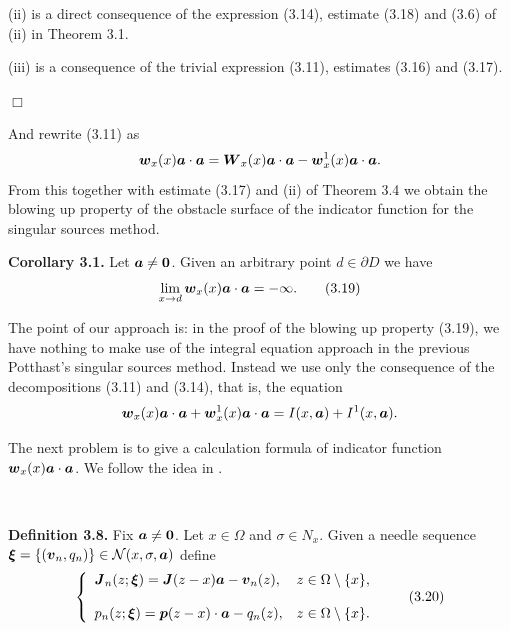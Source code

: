  \noindent
 (ii) is a direct consequence of  the expression  (3.14), estimate (3.18)
 and (3.6) of (ii) in Theorem 3.1.
 
 \noindent
 (iii) is a consequence of  the trivial expression (3.11), estimates (3.16) and (3.17).
 
 \noindent
 $\Box$
 

 And rewrite (3.11) as
 $$\displaystyle
 \mbox{\boldmath $w$}_x(x)\mbox{\boldmath $a$}\cdot\mbox{\boldmath $a$}
 = \mbox{\boldmath $W$}_x(x)\mbox{\boldmath $a$}\cdot\mbox{\boldmath $a$}
 -\mbox{\boldmath $w$}_x^1(x)\mbox{\boldmath $a$}\cdot\mbox{\boldmath $a$}.
 $$
 From this together with estimate (3.17) and (ii) of Theorem 3.4 
 we obtain the blowing up property
 of the obstacle surface of the indicator function for the singular sources method.
 
 
 
\proclaim
 {\bf\noindent Corollary 3.1.}
 Let $\mbox{\boldmath $a$}\not=\mbox{\boldmath $0$}$.
 Given an arbitrary point $d\in\partial D$ we have
 $$\displaystyle
 \lim_{x\rightarrow d}\mbox{\boldmath $w$}_x(x)\mbox{\boldmath $a$}\cdot\mbox{\boldmath $a$}=-\infty.
 \tag {3.19}
 $$
 
 
 
 
 \endproclaim
 
\noindent
The point of our approach is: in the proof of the blowing up property (3.19), we have nothing to make use of the integral equation approach in the previous Potthast's singular sources method.
Instead we use only the consequence of the decompositions (3.11) and (3.14), that is, the equation
$$\displaystyle
\mbox{\boldmath $w$}_x(x)\mbox{\boldmath $a$}\cdot\mbox{\boldmath $a$}
+\mbox{\boldmath $w$}_x^1(x)\mbox{\boldmath $a$}\cdot\mbox{\boldmath $a$}
=I(x,\mbox{\boldmath $a$})+I^1(x,\mbox{\boldmath $a$}).
$$

 
The next problem is to give a calculation formula of indicator function
$\mbox{\boldmath $w$}_x(x)\mbox{\boldmath $a$}\cdot\mbox{\boldmath $a$}$.
We follow the idea in \cite{IPS}.

$\quad$
 
 
 {\bf\noindent Definition 3.8.}  Fix $\mbox{\boldmath $a$}\not=\mbox{\boldmath $0$}$.
 Let $x\in\Omega$ and $\sigma\in N_x$.  Given a needle sequence $\mbox{\boldmath $\xi$}=\{(\mbox{\boldmath $v$}_n, q_n)\}\in{\cal N}(x,\sigma,\mbox{\boldmath $a$})$
define
$$\left\{
\begin{array}{ll}
\displaystyle
\mbox{\boldmath $J$}_n(z;\mbox{\boldmath $\xi$})=\mbox{\boldmath $J$}(z-x)\mbox{\boldmath $a$}-\mbox{\boldmath $v$}_n(z), & z\in\Omega\setminus\{x\},
\\
\\
\displaystyle
p_n(z;\mbox{\boldmath $\xi$})=\mbox{\boldmath $p$}(z-x)\cdot\mbox{\boldmath $a$}
-q_n(z), & z\in\Omega\setminus\{x\}.
\end{array}
\right.
\tag {3.20}
$$





